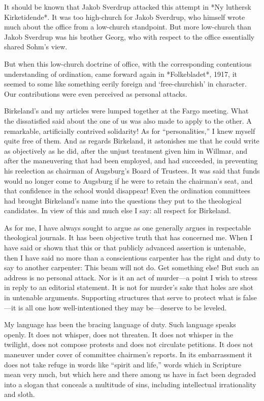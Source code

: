 It should be known that Jakob Sverdrup attacked this attempt in *Ny luthersk Kirketidende*. It was too high-church for Jakob Sverdrup, who himself wrote much about the office from a low-church standpoint. But more low-church than Jakob Sverdrup was his brother Georg, who with respect to the office essentially shared Sohm’s view.

But when this low-church doctrine of office, with the corresponding contentious understanding of ordination, came forward again in *Folkebladet*, 1917, it seemed to some like something eerily foreign and ‘free-churchish’ in character. Our contributions were even perceived as personal attacks.

Birkeland’s and my articles were lumped together at the Fargo meeting. What the dissatisfied said about the one of us was also made to apply to the other. A remarkable, artificially contrived solidarity! As for “personalities,” I knew myself quite free of them. And as regards Birkeland, it astonishes me that he could write as objectively as he did, after the unjust treatment given him in Willmar, and after the maneuvering that had been employed, and had succeeded, in preventing his reelection as chairman of Augsburg’s Board of Trustees. It was said that funds would no longer come to Augsburg if he were to retain the chairman’s seat, and that confidence in the school would disappear! Even the ordination committees had brought Birkeland’s name into the questions they put to the theological candidates. In view of this and much else I say: all respect for Birkeland.

As for me, I have always sought to argue as one generally argues in respectable theological journals. It has been objective truth that has concerned me. When I have said or shown that this or that publicly advanced assertion is untenable, then I have said no more than a conscientious carpenter has the right and duty to say to another carpenter: This beam will not do. Get something else! But such an address is no personal attack. Nor is it an act of murder—a point I wish to stress in reply to an editorial statement. It is not for murder’s sake that holes are shot in untenable arguments. Supporting structures that serve to protect what is false—it is all one how well-intentioned they may be—deserve to be leveled.

My language has been the bracing language of duty. Such language speaks openly. It does not whisper, does not threaten. It does not whisper in the twilight, does not compose protests and does not circulate petitions. It does not maneuver under cover of committee chairmen’s reports. In its embarrassment it does not take refuge in words like “spirit and life,” words which in Scripture mean very much, but which here and there among us have in fact been degraded into a slogan that conceals a multitude of sins, including intellectual irrationality and sloth.

